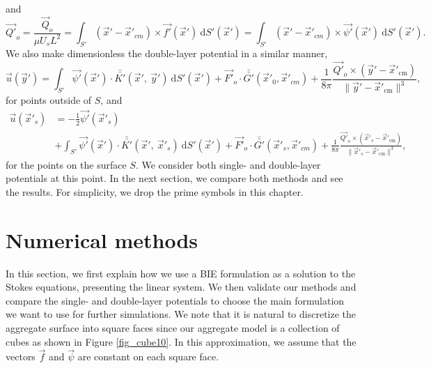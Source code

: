  and
 \begin{equation}
 \vec{Q'}_o = \frac{\vec{Q}_o}{\mu U_s L^2}
 = \int_{S'} (\vec{x}' - \vec{x}'_{cm}) \times \vec{f'}(\vec{x}')  \ \text{d}S' (\vec{x}')
 =  \int_{S'} (\vec{x}' - \vec{x}'_{cm}) \times \vec{\psi'}(\vec{x}') \ \text{d}S'(\vec{x}').
 \label{eq_total_Torque_noD}
 \end{equation}
 We also make dimensionless the double-layer potential in a similar manner, 
 \begin{equation}
 \vec{u}(\vec{y}') = \int_{S'}
 \vec{\psi'}(\vec{x}') \cdot  \bar{\bar{K'}}(\vec{x}', \ \vec{y}')  \ \text{d}S' (\vec{x}') + \vec{F'}_o \cdot \bar{\bar{G'}}(\vec{x}'_{0},\vec{x}'_{cm})
 +\frac{1}{8 \pi} \frac{\vec{Q'}_o \times
 (\vec{y}'   - \vec{x}'_{\text{cm}} ) }{\| \vec{y}'   - \vec{x}'_{\text{cm}} \|^3 },
  \label{eq_BI_DL_noD}
 \end{equation}
 for points outside of $S$, and
 \begin{align}
 \vec{u}(\vec{x}'_s) 
 & =  -\frac{1}{2}\vec{\psi'}(\vec{x}'_s)
 \nonumber  \\
&+  \int_{S'}
 \vec{\psi'}(\vec{x}') \cdot  \bar{\bar{K'}}(\vec{x}', \ \vec{x}'_s)  \ \text{d}S' (\vec{x}') + \vec{F'}_o \cdot \bar{\bar{G'}}(\vec{x}'_{s},\vec{x}'_{cm})
 +\frac{1}{8 \pi} \frac{\vec{Q'}_o \times
 (\vec{x}'_s   - \vec{x}'_{\text{cm}} ) }{\| \vec{x}'_s   - \vec{x}'_{\text{cm}} \|^3 },
  \label{eq_BI_DL_jump_noD}
 \end{align}
 for the points on the surface $S$.
We consider both single- and double-layer potentials at this point. In the next section, we compare both methods and see the results. For simplicity, we drop the prime symbols in this chapter.
\section{Numerical methods}
In this section, we first explain how we use a BIE formulation as a solution to the Stokes equations, presenting the linear system. We then validate our methods and compare the single- and double-layer potentials to choose the main formulation we want to use for further simulations. We note that it is natural to discretize the aggregate surface into square faces since our aggregate model is a collection of cubes as shown in Figure \ref{fig_cube10}. In this approximation, we assume that the vectors $\vec{f}$ and $\vec{\psi}$ are constant on each square face.
